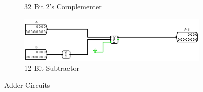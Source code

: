 \documentclass[12pt]{article}
\begin{document}
\begin{figure}[H]
\begin{subfigure}[b]{0.3\textwidth}
        \caption{32 Bit 2's Complementer}
        \label{fig:32bit2compl}
    \end{subfigure}
    \begin{subfigure}[b]{0.3\textwidth}
        \includegraphics[width=\textwidth]{Images/12Sub.png}
        \caption{12 Bit Subtractor}
        \label{fig:12bitsub}
    \end{subfigure}
    \caption{Adder Circuits}\label{fig:adder}
\end{figure}
\end{document}
